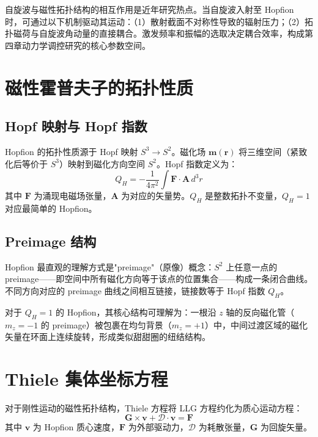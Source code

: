 自旋波与磁性拓扑结构的相互作用是近年研究热点\cite{liu2020three}。当自旋波入射至 Hopfion 时，可通过以下机制驱动其运动：（1）散射截面不对称性导致的辐射压力；（2）拓扑磁荷与自旋波角动量的直接耦合。激发频率和振幅的选取决定耦合效率，构成第四章动力学调控研究的核心参数空间。


\section{磁性霍普夫子的拓扑性质}

\subsection{Hopf 映射与 Hopf 指数}

Hopfion 的拓扑性质源于 Hopf 映射 $S^3 \to S^2$。磁化场 $\mathbf{m}(\mathbf{r})$ 将三维空间（紧致化后等价于 $S^3$）映射到磁化方向空间 $S^2$。Hopf 指数定义为：
\begin{equation}
  Q_H = -\frac{1}{4\pi^2} \int \mathbf{F} \cdot \mathbf{A} \, d^3r
  \label{eq:hopf-index}
\end{equation}
其中 $\mathbf{F}$ 为涌现电磁场张量，$\mathbf{A}$ 为对应的矢量势。$Q_H$ 是整数拓扑不变量，$Q_H = 1$ 对应最简单的 Hopfion。

\subsection{Preimage 结构}

Hopfion 最直观的理解方式是"preimage"（原像）概念：$S^2$ 上任意一点的 preimage——即空间中所有磁化方向等于该点的位置集合——构成一条闭合曲线。不同方向对应的 preimage 曲线之间相互链接，链接数等于 Hopf 指数 $Q_H$。

对于 $Q_H = 1$ 的 Hopfion，其核心结构可理解为：一根沿 $z$ 轴的反向磁化管（$m_z = -1$ 的 preimage）被包裹在均匀背景（$m_z = +1$）中，中间过渡区域的磁化矢量在环面上连续旋转，形成类似甜甜圈的纽结结构。


\section{Thiele 集体坐标方程}

对于刚性运动的磁性拓扑结构，Thiele 方程将 LLG 方程约化为质心运动方程：
\begin{equation}
  \mathbf{G} \times \mathbf{v} + \mathcal{D} \cdot \mathbf{v} = \mathbf{F}
  \label{eq:thiele}
\end{equation}
其中 $\mathbf{v}$ 为 Hopfion 质心速度，$\mathbf{F}$ 为外部驱动力，$\mathcal{D}$ 为耗散张量，$\mathbf{G}$ 为回旋矢量。

